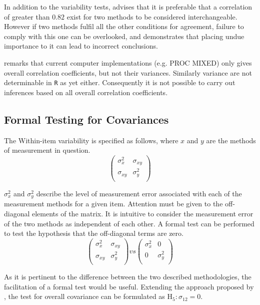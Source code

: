 \documentclass[12pt, a4paper]{report}
\theoremstyle{plain}
\theoremstyle{definition}
\theoremstyle{remark}
\begin{document}
In addition to the variability tests, \citet{ARoy2009} advises that it is preferable that a correlation of greater than $0.82$ exist for two methods to be considered interchangeable. However if two methods fulfil all the other conditions for agreement, failure to comply with this one can be overlooked, and demonstrates that placing undue importance to it can lead to incorrect conclusions.

\citet{ARoy2009} remarks that current computer implementations (e.g. PROC MIXED) only gives overall correlation coefficients, but not their variances. Similarly variance are not determinable in \texttt{R} as yet either. Consequently it is not possible to carry out inferences based on all overall correlation coefficients.
\subsection{Formal Testing for Covariances} %

The Within-item variability is specified as follows, where $x$ and $y$ are the methods of measurement in question.
\[ \left(
\begin{array}{cc}
\sigma^2_x & \sigma_{xy} \\
\sigma_{xy} & \sigma^2_y \\
\end{array}
\right)
\]

$\sigma^2_x$ and $\sigma^2_y$ describe the level of measurement error associated with each of the measurement methods for a given item. Attention must be given to the off-diagonal elements of the matrix. It is intuitive to consider the measurement error of the two methods as independent of each other. A formal test can be performed to test the hypothesis that the off-diagonal terms are zero.
\[ \left(
\begin{array}{cc}
\sigma^2_x & \sigma_{xy} \\
\sigma_{xy} & \sigma^2_y \\
\end{array}
\right) vs \left(
\begin{array}{cc}
\sigma^2_x & 0 \\
0 & \sigma^2_y \\
\end{array}
\right)
\]

As it is pertinent to the difference between the two described methodologies, the facilitation of a formal test would be useful. Extending the approach proposed by \citet{ARoy2009}, the test for overall covariance can be formulated as $\operatorname{H_5} : \sigma_{12} = 0$.
\end{document}
